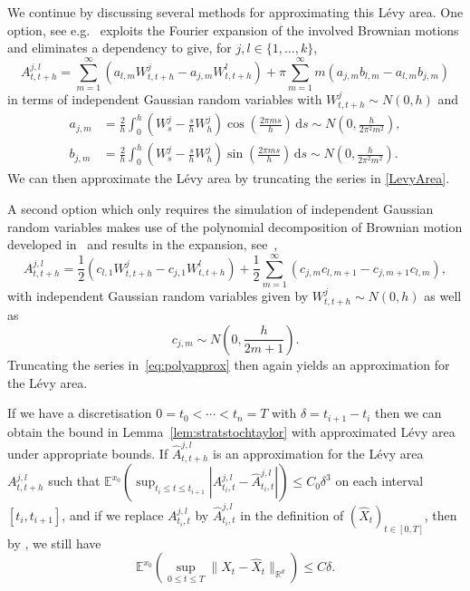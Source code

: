 \documentclass[10pt]{amsart}
\theoremstyle{remark}
\newcommand{\E}{\mathbb{E}}
\newcommand{\R}{\mathbb{R}}
\newcommand{\dd}{\,{\mathrm d}}
\numberwithin{equation}{section}
\begin{document}
We continue by discussing several methods for approximating this Lévy area. One option, see e.g.~\cite{kloeden1992approximation,milstein2013numerical,mrongowius2022approximation} exploits the Fourier expansion of the involved Brownian motions and eliminates a dependency to give, for $j,l\in\{1,\dots,k\}$,
\begin{equation} \label{LevyArea}
    A^{j,l}_{t,t+ h} = 
    \sum_{m=1}^\infty\left(a_{l,m} W^j_{t,t+h} - a_{j,m} W^l_{t,t+h} \right)+  \pi \sum_{m=1}^\infty m(a_{j,m} b_{l,m} -a_{l,m} b_{j,m} )
\end{equation}
in terms of independent Gaussian random variables with $W^j_{t,t+h} \sim N(0, h)$ and
\begin{align*}
    a_{j,m}
    &=\frac{2}{h} \int_0^h \left(W_s^j -\frac{s}{h} W_h^j \right)
    \cos\left(\frac{2\pi ms}{h}\right)\dd s
    \sim N\left(0, \frac{h}{2\pi^2 m^2}\right),\\
    b_{j,m}
    &=\frac{2}{h} \int_0^h \left(W_s^j -\frac{s}{h} W_h^j \right)
    \sin\left(\frac{2\pi ms}{h}\right)\dd s
    \sim N\left(0, \frac{h}{2\pi^2 m^2}\right).
\end{align*}
We can then approximate the Lévy area by truncating the series in \eqref{LevyArea}.

A second option which only requires the simulation of independent Gaussian random variables makes use of the polynomial decomposition of Brownian motion developed in~\cite{foster20,semicircle} and results in the expansion, see~\cite{foster_habermann,KuznetsovLevyArea1},
\begin{equation}\label{eq:polyapprox}
    A_{t,t+h}^{j,l}
    =\frac{1}{2}\left(c_{l,1} W_{t,t+h}^j - c_{j,1} W_{t,t+h}^l \right)
    +\frac{1}{2}\sum_{m=1}^\infty\left(c_{j,m}c_{l,m+1}-c_{j,m+1}c_{l,m}\right),
\end{equation}
with independent Gaussian random variables given by $W_{t,t+h}^j\sim N(0,h)$ as well as
\begin{displaymath}
    c_{j,m}\sim N\left(0,\frac{h}{2m+1}\right).
\end{displaymath}
Truncating the series in~\eqref{eq:polyapprox} then again yields an approximation for the Lévy area.

If we have a discretisation $0 =t_0 < \cdots < t_n=T$ with $\delta = t_{i+1}- t_i$ then we can obtain the bound in Lemma~\ref{lem:stratstochtaylor} with approximated Lévy area under appropriate bounds. If $\hat A_{t,t+h}^{j,l}$ is an approximation for the Lévy area $A_{t,t+h}^{j,l}$ such that $\E^{x_0}(\sup_{t_i \leq t \leq t_{i+1}}| A^{j,l}_{t_{i},t} - \hat A^{j,l}_{t_i,t}| ) \leq C_0 \delta^3$ on each interval $[t_i,t_{i+1}]$, and if we replace $ A^{j,l}_{t_i,t}$ by $\hat A^{j,l}_{t_i,t}$ in the definition of $(\hat X_t)_{t\in[0,T]}$, then by \cite[Corollary~10.7.3]{kloeden1992stochastic}, we still have
$$\E^{x_0}\left(\sup_{0 \leq t \leq T} \| X_t - \hat X_t\|_{\R^d} \right) \leq C \delta.$$
\end{document}
